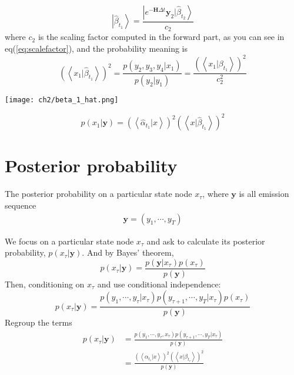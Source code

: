 \begin{definition}
\begin{equation}
        \left|\hat{\beta}_{t_1}  \right> =  \frac{\left| e^{-\textbf{H}\Delta t} \textbf{y}_2 |\hat{\beta}_{t_2} \right>}{c_2}
\end{equation}
where $c_2$ is the scaling factor computed in the forward part, as you can see in eq(\ref{eq:scalefactor}), and 
the probability meaning is
\begin{equation}
        \left(\left<x_1|\hat{\beta}_{t_1} \right>\right)^2 = \frac{p(y_2, y_3, y_4|x_1)}{p(y_2|y_1)} 
        =  \frac{ (\left<x_1|\beta_{t_1} \right>)^2 }{ c_2^2 }
\end{equation}
\begin{center}
        \texttt{[image: ch2/beta\_1\_hat.png]}
\end{center}
\begin{equation}
        p(x_1|\textbf{y}) = (\left<\hat{\alpha}_{t_{1}}|x \right>)^2 \left(\left<x|\hat{\beta}_{t_{1}} \right>\right)^2
\end{equation} 
\end{definition}

\section{Posterior probability}
\begin{definition} 
The posterior probability on a particular state node $x_{\tau}$, where $\textbf{y}$ is all emission sequence
\begin{align*}
        \textbf{y} = (y_1,\cdots,y_T)
\end{align*} 
\end{definition}
\noindent We focus on a particular state node $x_{\tau}$ and ask to calculate its posterior probability, $p(x_{\tau}| \textbf{y})$. And by Bayes' theorem,
\begin{equation}
p(x_{\tau} | \textbf{y}) = \frac{p(\textbf{y}|x_{\tau}) p(x_{\tau})}{p(\textbf{y})}
\end{equation}
Then, conditioning on $x_{\tau}$ and use conditional independence:
\begin{equation}
p(x_{\tau} | \textbf{y}) = \frac{p(y_1,\cdots,y_{\tau}|x_{\tau}) p(y_{\tau+1},\cdots,y_T|x_{\tau}) p(x_{\tau})}{p(\textbf{y})}
\end{equation}
Regroup the terms
\begin{equation}
\begin{split}
p(x_{\tau} | \textbf{y}) &= \frac{p(y_1,\cdots,y_{\tau},x_{\tau}) p(y_{\tau+1},\cdots,y_T|x_{\tau})}{p(\textbf{y})}\\
&=\frac{(\left<\alpha_{t_{\tau}}|x \right>)^2 (\left<x|\beta_{t_{\tau}} \right>)^2 }{p(\textbf{y})}
\end{split}
\end{equation}

